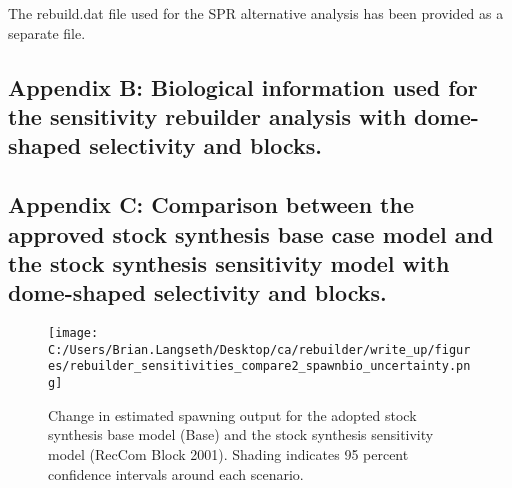 \documentclass[11pt,
  english,
  a4paper,
]{article}
\begin{document}
\leavevmode\tagmcend\tagstructend


The rebuild.dat file used for the SPR alternative analysis has been provided as a separate file.

\leavevmode\tagmcend\tagstructend\par


\hypertarget{append_b}{%
\subsection{Appendix B: Biological information used for the sensitivity rebuilder analysis with dome-shaped selectivity and blocks.}\label{append_b}}

\leavevmode\tagmcend\tagstructend


\hypertarget{append_b}{%
\subsection{Appendix C: Comparison between the approved stock synthesis base case model and the stock synthesis sensitivity model with dome-shaped selectivity and blocks.}\label{append_b}}

\leavevmode\tagmcend\tagstructend


\begin{figure}
\centering
\texttt{[image: C:/Users/Brian.Langseth/Desktop/ca/rebuilder/write\_up/figures/rebuilder\_sensitivities\_compare2\_spawnbio\_uncertainty.png]}
\caption{Change in estimated spawning output for the adopted stock synthesis base model (Base) and the stock synthesis sensitivity model (RecCom Block 2001). Shading indicates 95 percent confidence intervals around each scenario.\label{fig:ssb-sens}}
\end{figure}

\tagmcend\tagstructend

\end{document}
